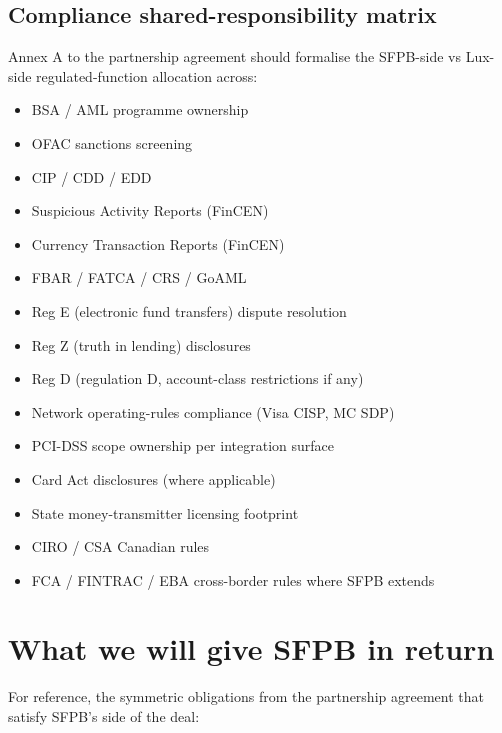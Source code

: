 \documentclass[11pt,letterpaper]{article}
\begin{document}
\subsection{Compliance shared-responsibility matrix}
Annex A to the partnership agreement should formalise the SFPB-side vs
Lux-side regulated-function allocation across:

\begin{itemize}[leftmargin=1.6em]
  \item BSA / AML programme ownership
  \item OFAC sanctions screening
  \item CIP / CDD / EDD
  \item Suspicious Activity Reports (FinCEN)
  \item Currency Transaction Reports (FinCEN)
  \item FBAR / FATCA / CRS / GoAML
  \item Reg E (electronic fund transfers) dispute resolution
  \item Reg Z (truth in lending) disclosures
  \item Reg D (regulation D, account-class restrictions if any)
  \item Network operating-rules compliance (Visa CISP, MC SDP)
  \item PCI-DSS scope ownership per integration surface
  \item Card Act disclosures (where applicable)
  \item State money-transmitter licensing footprint
  \item CIRO / CSA Canadian rules
  \item FCA / FINTRAC / EBA cross-border rules where SFPB extends
\end{itemize}

\section{What we will give SFPB in return}

For reference, the symmetric obligations from the partnership agreement
that satisfy SFPB's side of the deal:
\end{document}
